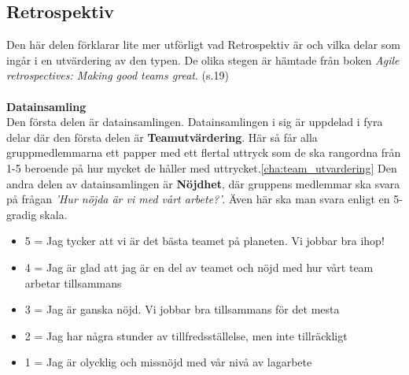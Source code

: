 \subsection{Retrospektiv}
Den här delen förklarar lite mer utförligt vad Retrospektiv är och vilka delar som ingår i en utvärdering av den typen. De olika stegen är hämtade från boken \textit{Agile retrospectives: Making good teams great}.\cite{agile_retrospectives} (s.19)\\\\
\textbf{Datainsamling}\\
Den första delen är datainsamlingen. Datainsamlingen i sig är uppdelad i fyra delar där den första delen är \textbf{Teamutvärdering}. 
Här så får alla gruppmedlemmarna ett papper med ett flertal uttryck som de ska rangordna från 1-5 beroende på hur mycket de håller med uttrycket.\ref{cha:team_utvardering} Den andra delen av datainsamlingen är \textbf{Nöjdhet}, där gruppens medlemmar ska svara på frågan \textit{'Hur nöjda är vi med vårt arbete?'}. Även här ska man svara enligt en 5-gradig skala.
\begin{itemize}
\item 5 = Jag tycker att vi är det bästa teamet på planeten. Vi jobbar bra ihop!
\item 4	= Jag är glad att jag är en del av teamet och nöjd med hur vårt team arbetar tillsammans
\item 3	= Jag är ganska nöjd. Vi jobbar bra tillsammans för det mesta
\item 2	= Jag har några stunder av tillfredsställelse, men inte tillräckligt
\item 1	= Jag är olycklig och missnöjd med vår nivå av lagarbete
\end{itemize}


